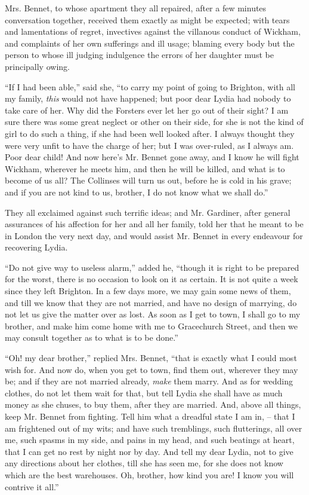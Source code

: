 Mrs. Bennet, to whose apartment they all repaired,
after a few minutes conversation together, received them
exactly as might be expected; with tears and lamentations
of regret, invectives against the villanous conduct
of Wickham, and complaints of her own sufferings and
ill usage; blaming every body but the person to whose
ill judging indulgence the errors of her daughter must be
principally owing.

“If I had been able,” said she, “to carry my point of
going to Brighton, with all my family, \textit{this} would not
have happened; but poor dear Lydia had nobody to
take care of her. Why did the Forsters ever let her go
out of their sight? I am sure there was some great
neglect or other on their side, for she is not the kind of
girl to do such a thing, if she had been well looked after.
I always thought they were very unfit to have the charge
of her; but I was over-ruled, as I always am. Poor
dear child! And now here’s Mr. Bennet gone away, and
I know he will fight Wickham, wherever he meets him,
and then he will be killed, and what is to become of us all?
The Collinses will turn us out, before he is cold in his
grave; and if you are not kind to us, brother, I do not
know what we shall do.”

They all exclaimed against such terrific ideas; and
Mr. Gardiner, after general assurances of his affection for
her and all her family, told her that he meant to be in
London the very next day, and would assist Mr. Bennet
in every endeavour for recovering Lydia.

“Do not give way to useless alarm,” added he, “though
it is right to be prepared for the worst, there is no occasion
to look on it as certain. It is not quite a week since they
left Brighton. In a few days more, we may gain some
news of them, and till we know that they are not married,
and have no design of marrying, do not let us give the
matter over as lost. As soon as I get to town, I shall
go to my brother, and make him come home with me to
Gracechurch Street, and then we may consult together as
to what is to be done.”

“Oh! my dear brother,” replied Mrs. Bennet, “that
is exactly what I could most wish for. And now do,
when you get to town, find them out, wherever they may
be; and if they are not married already, \textit{make} them
marry. And as for wedding clothes, do not let them wait
for that, but tell Lydia she shall have as much money
as she chuses, to buy them, after they are married. And,
above all things, keep Mr. Bennet from fighting. Tell
him what a dreadful state I am in, -- that I am frightened
out of my wits; and have such tremblings, such flutterings,
all over me, such spasms in my side, and pains in
my head, and such beatings at heart, that I can get no
rest by night nor by day. And tell my dear Lydia, not
to give any directions about her clothes, till she has seen
me, for she does not know which are the best warehouses.
Oh, brother, how kind you are! I know you will contrive
it all.”

